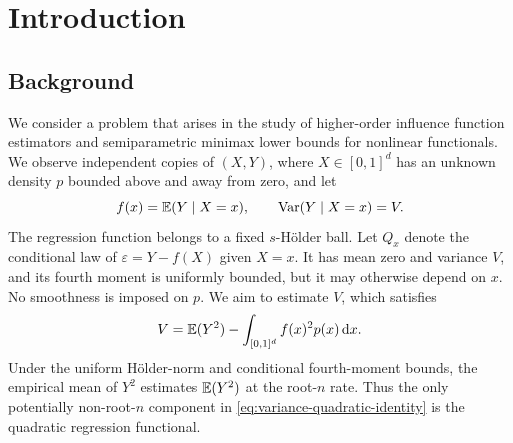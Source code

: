 \chapter{Introduction}\label{sec:introduction}

\section{Background}\label{sec:intro-background}

We consider a problem that arises in the study of higher-order
influence function estimators \cite{RobinsEtAl2008} and semiparametric
minimax lower bounds \cite{RobinsEtAl2009EJS} for nonlinear
functionals. We observe independent copies
of $(X,Y)$, where $X\in[0,1]^d$ has an unknown density $p$ bounded
above and away from zero, and let
\[
 f(x)=\mathbb E(Y\mid X=x),\qquad \operatorname{Var}(Y\mid X=x)=V.
\]
The regression function belongs to a fixed $s$-H\"older ball. Let
$Q_x$ denote the conditional law of $\varepsilon=Y-f(X)$ given $X=x$.
It has mean zero and variance $V$, and its fourth moment is uniformly
bounded, but it may otherwise depend on $x$. No smoothness is imposed on $p$.
We aim to estimate $V$, which satisfies
\begin{equation}\label{eq:variance-quadratic-identity}
 V=\mathbb E(Y^2)-\int_{[0,1]^d}f(x)^2p(x)\,\mathrm dx.
\end{equation}
Under the uniform H\"older-norm and conditional fourth-moment bounds,
the empirical mean of $Y^2$ estimates $\mathbb E(Y^2)$ at the root-$n$ rate.
Thus the only potentially non-root-$n$ component in
\eqref{eq:variance-quadratic-identity} is the quadratic regression
functional.

